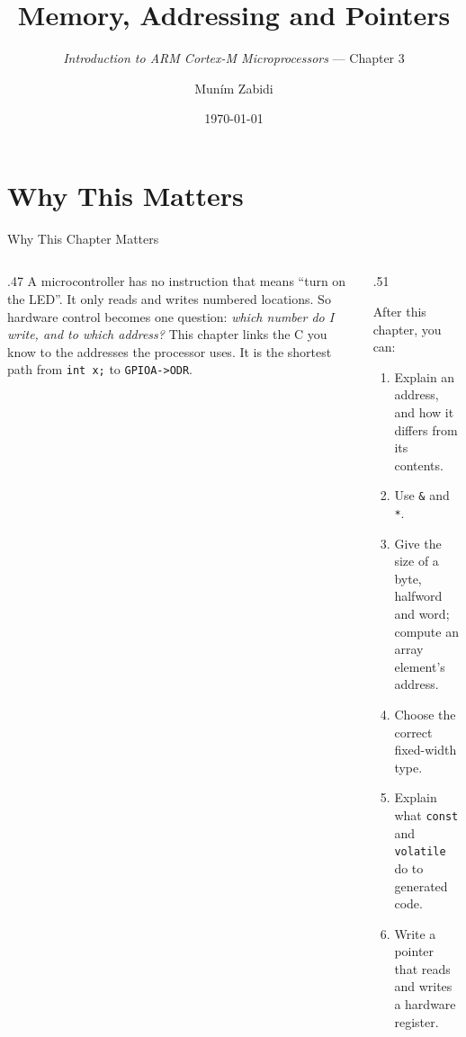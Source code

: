 \documentclass[9pt,aspectratio=169,xcolor=table]{beamer}
\title{Memory, Addressing and Pointers}
\subtitle{\emph{Introduction to ARM Cortex-M Microprocessors} --- Chapter 3}
\author{Mun\'{i}m Zabidi}
\institute{\color{primary}Faculty of Electrical Engineering, Universiti Teknologi Malaysia}
\date{\today}
\begin{document}
\titlepage

\section{Why This Matters}
\begin{frame}{Why This Chapter Matters}
    \begin{columns}[T]
    \begin{column}{.47\textwidth}
        {\normalsize A microcontroller has no instruction that means ``turn on the LED''. It only reads and writes numbered locations. So hardware control becomes one question: \emph{which number do I write, and to which address?} This chapter links the C you know to the addresses the processor uses. It is the shortest path from \texttt{int x;} to \texttt{GPIOA->ODR}.}
    \end{column}
    \begin{column}{.51\textwidth}
        \begin{block}{After this chapter, you can:}
        {\small
        \begin{enumerate}\itemsep2pt
            \item Explain an address, and how it differs from its contents.
            \item Use \texttt{\&} and \texttt{*}.
            \item Give the size of a byte, halfword and word; compute an array element's address.
            \item Choose the correct fixed-width type.
            \item Explain what \texttt{const} and \texttt{volatile} do to generated code.
            \item Write a pointer that reads and writes a hardware register.
        \end{enumerate}}
        \end{block}
    \end{column}
    \end{columns}
\end{frame}
\end{document}

